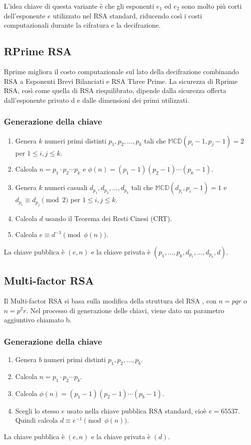 \documentclass[a4paper,12pt]{report}
\begin{document}
L'idea chiave di questa variante è che gli esponenti $e_1$ ed $e_2$ sono molto più corti dell'esponente $e$ utilizzato nel RSA standard, riducendo così i costi computazionali durante la cifratura e la decifrazione.

\subsection{RPrime RSA} \cite{Nasution_2020}
Rprime migliora il costo computazionale sul lato della decifrazione combinando RSA a Esponenti Brevi Bilanciati e RSA Three Prime. 
La sicurezza di Rprime RSA, così come quella di RSA riequilibrato, dipende dalla sicurezza offerta dall'esponente privato d e dalle dimensioni dei primi utilizzati.
\subsubsection*{Generazione della chiave}
\begin{enumerate}
\item Genera $k$ numeri primi distinti $p_1, p_2, \ldots, p_k$ tali che $\mathbb{MCD}(p_i - 1, p_j - 1) = 2$ per $1 \leq i, j \leq k$.
\item Calcola $n = p_1 \cdot p_2 \cdots p_k$ e $\phi(n) = (p_1 - 1)(p_2 - 1) \cdots (p_k - 1)$.
\item Genera $k$ numeri casuali $d_{p_1}, d_{p_2}, \ldots, d_{p_k}$ tali che $\mathbb{MCD}(d_{p_i}, p_i - 1) = 1$ e $d_{p_i} \equiv d_{p_j} \pmod{2}$ per $1 \leq i, j \leq k$.
\item Calcola $d$ usando il Teorema dei Resti Cinesi (CRT).
\item Calcola $e \equiv d^{-1} \pmod{\phi(n)}$.
\end{enumerate}
La chiave pubblica è $(e, n)$ e la chiave privata è $(p_1, \ldots, p_k, d_{p_1}, \ldots, d_{p_k}, d)$.

\subsection{Multi-factor RSA} \cite{Nasution_2020}
Il Multi-factor RSA si basa sulla modifica della struttura del RSA , con \(n = pqr\) o \(n = p^2 r\). 
Nel processo di generazione delle chiavi, viene dato un parametro aggiuntivo chiamato b. 

\subsubsection*{Generazione della chiave}
\begin{enumerate}
\item Genera $b$ numeri primi distinti $p_1, p_2, \ldots, p_b$.
\item Calcola $n = p_1 \cdot p_2 \cdots p_b$.
\item Calcola $\phi(n) = (p_1 - 1)(p_2 - 1) \cdots (p_b - 1)$.
\item Scegli lo stesso $e$ usato nella chiave pubblica RSA standard, cioè $e = 65537$. Quindi calcola $d \equiv e^{-1} \pmod{\phi(n)}$.
\end{enumerate}
La chiave pubblica è $(e, n)$ e la chiave privata è $(d)$.
\end{document}

